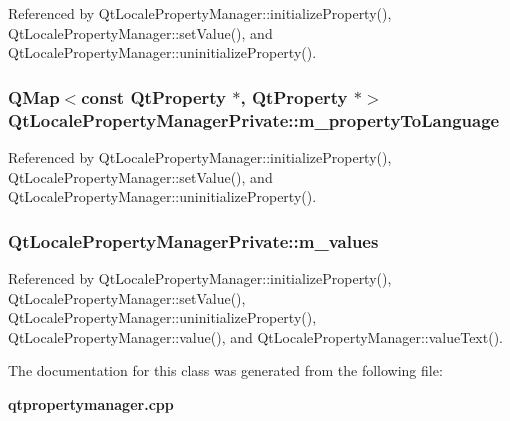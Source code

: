 Referenced by Qt\+Locale\+Property\+Manager\+::initialize\+Property(), Qt\+Locale\+Property\+Manager\+::set\+Value(), and Qt\+Locale\+Property\+Manager\+::uninitialize\+Property().

\subsubsection[{m\+\_\+property\+To\+Language}]{\setlength{\rightskip}{0pt plus 5cm}Q\+Map$<$const {\bf Qt\+Property} $\ast$, {\bf Qt\+Property} $\ast$$>$ Qt\+Locale\+Property\+Manager\+Private\+::m\+\_\+property\+To\+Language}\label{classQtLocalePropertyManagerPrivate_af2f17e5a639c11cda52b6de2a3159e4d}


Referenced by Qt\+Locale\+Property\+Manager\+::initialize\+Property(), Qt\+Locale\+Property\+Manager\+::set\+Value(), and Qt\+Locale\+Property\+Manager\+::uninitialize\+Property().

\subsubsection[{m\+\_\+values}]{ Qt\+Locale\+Property\+Manager\+Private\+::m\+\_\+values}\label{classQtLocalePropertyManagerPrivate_a5a55ca279b143ac0ee6f40074afa2d15}


Referenced by Qt\+Locale\+Property\+Manager\+::initialize\+Property(), Qt\+Locale\+Property\+Manager\+::set\+Value(), Qt\+Locale\+Property\+Manager\+::uninitialize\+Property(), Qt\+Locale\+Property\+Manager\+::value(), and Qt\+Locale\+Property\+Manager\+::value\+Text().



The documentation for this class was generated from the following file\+:\begin{DoxyCompactItemize}
\item 
{\bf qtpropertymanager.\+cpp}\end{DoxyCompactItemize}
